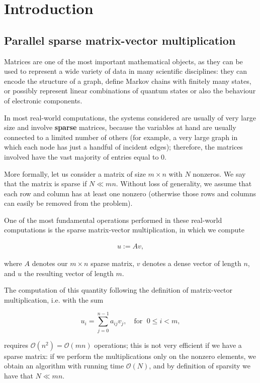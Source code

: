 \chapter{Introduction}
\section{Parallel sparse matrix-vector multiplication} \label{sec:par_matvec}
Matrices are one of the most important mathematical objects, as they can be used to represent a wide variety of data in many scientific disciplines: they can encode the structure of a graph, define Markov chains with finitely many states, or possibly represent linear combinations of quantum states or also the behaviour of electronic components. 

In most real-world computations, the systems considered are usually of very large size and involve \textbf{sparse} matrices, because the variables at hand are usually connected to a limited number of others (for example, a very large graph in which each node has just a handful of incident edges); therefore, the matrices involved have the vast majority of entries equal to 0.

More formally, let us consider a matrix of size $m \times n$ with $N$ nonzeros. We say that the matrix is sparse if $ N \ll mn $. Without loss of generality, we assume that each row and column has at least one nonzero (otherwise those rows and columns can easily be removed from the problem).

One of the most fundamental operations performed in these real-world computations is the sparse matrix-vector multiplication, in which we compute

\begin{align}
	u:=Av,
	\label{uAv}
\end{align}

where $A$ denotes our $m \times n$ sparse matrix, $v$ denotes a dense vector of length $n$, and $u$ the resulting vector of length $m$.

The computation of this quantity following the definition of matrix-vector multiplication, i.e. with the sum 

\[ 
	u_i = \sum_{j=0}^{n-1} a_{ij} v_j, \quad \text{for }\; 0 \leq i < m,
\]

requires $\mathcal{O}(n^2) = \mathcal{O}(mn)$ operations; this is not very efficient if we have a sparse matrix: if we perform the multiplications only on the nonzero elements, we obtain an algorithm with running time $\mathcal{O}(N)$, and by definition of sparsity we have that $N \ll mn$.

